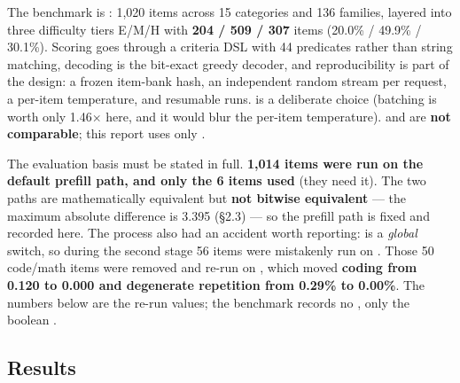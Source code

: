 The benchmark is : 1{,}020 items across 15 categories and 136 families, layered
into three difficulty tiers E/M/H with \textbf{204 / 509 / 307} items (20.0\% / 49.9\% / 30.1\%).
Scoring goes through a criteria DSL with 44 predicates rather than string matching, decoding is
the bit-exact greedy decoder, and reproducibility is part of the design: a frozen item-bank hash,
an independent random stream per request, a per-item temperature, and resumable runs.
\textbf{} is a deliberate choice (batching is worth only 1.46$\times$ here, and it
would blur the per-item temperature).  and  are \textbf{not comparable};
this report uses only .

The evaluation basis must be stated in full. \textbf{1{,}014 items were run on the default
 prefill path, and only the 6  items used } (they
need it). The two paths are mathematically equivalent but \textbf{not bitwise equivalent} --- the
maximum absolute difference is 3.395 (\S2.3) --- so the prefill path is fixed and recorded here.
The process also had an accident worth reporting:  is a \emph{global} switch,
so during the second stage 56 items were mistakenly run on . Those 50 code/math
items were removed and re-run on , which moved \textbf{coding from 0.120 to 0.000
and degenerate repetition from 0.29\% to 0.00\%}. The numbers below are the re-run values; the
benchmark records no , only the boolean .

\subsection{Results}

